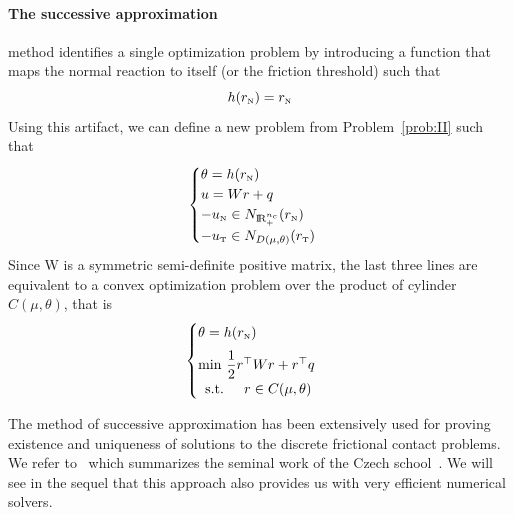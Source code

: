 \paragraph{The successive approximation} method identifies a single optimization problem by introducing a function that maps the normal reaction to itself (or the friction threshold) such that
\begin{equation}
  \label{eq:Haslinger-g}
  h(r_\n)  = r_\n
\end{equation}
Using this artifact, we can define a new problem from Problem~\ref{prob:II} such that
\begin{equation}
  \label{eq:Haslinger-1}
  \begin{cases}
    \theta = h(r_\n) \\
    u = W r + q \\
    -u_{\n} \in N_{\RR^{n_c}_+}(r_\n) \\
    -u_{\t} \in N_{D(\mu,\theta)}(r_\t)
  \end{cases}
\end{equation}
Since W is a symmetric semi-definite positive matrix, the last three lines are equivalent to a convex optimization problem over the product of cylinder $C(\mu,\theta)$, that is
\begin{equation}
  \label{eq:Haslinger-2}
  \begin{cases}
    \theta = h(r_\n) \\[2mm]
    \min\, \Frac 1 2 r^\top W r + r^\top q \\
    \begin{array}{ll}
    \text{s.t. }& r \in C(\mu,\theta)
  \end{array}
  \end{cases}
\end{equation}

The method of successive approximation has been extensively used for proving existence and uniqueness of solutions to the discrete frictional contact problems. We refer to~\cite{Haslinger.ea1996} which summarizes the seminal work of the Czech school~\cite{Necas.ea1980,Haslinger1983,Haslinger1984}. We will see in the sequel that this approach also provides us with very efficient numerical solvers.

